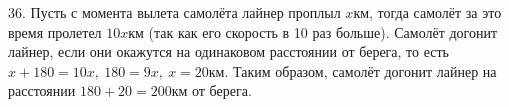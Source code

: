 36. Пусть с момента вылета самолёта лайнер проплыл $x$км, тогда самолёт за это время пролетел $10x$км (так как его скорость в 10 раз больше). Самолёт догонит лайнер, если они окажутся на одинаковом расстоянии от берега, то есть $x+180=10x,\ 180=9x,\ x=20$км. Таким образом, самолёт догонит лайнер на расстоянии $180+20=200$км от берега.\\
